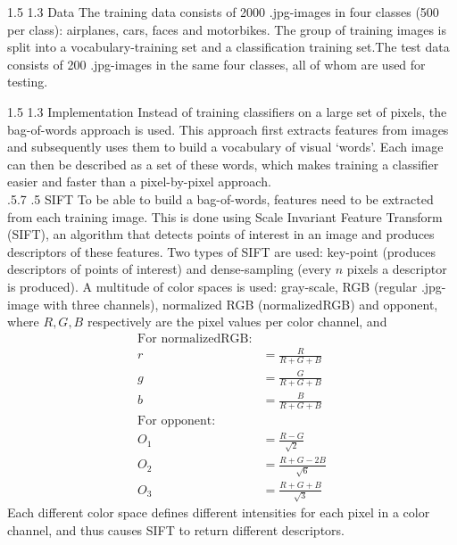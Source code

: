 \documentclass[12pt,a4paper]{amsart}
\makeatletter
\def\section{%
  \@startsection{section}{1}{\z@}%
  {1.5\linespacing\@plus\linespacing}%
  {1.3\linespacing}%
  {\bfseries\normalfont\scshape}
}
\def\subsection{\@startsection{subsection}{2}{\z@}%
  {.5\linespacing\@plus.7\linespacing}%
  {.5\linespacing}%
  {\small\normalfont}}
\makeatother
\begin{document}
\section{Data}
The training data consists of 2000 .jpg-images in four classes (500 per class): airplanes, cars, faces and motorbikes. The group of training images is split into a vocabulary-training set and a classification training set.The test data consists of 200 .jpg-images in the same four classes, all of whom are used for testing.

\section{Implementation}
Instead of training classifiers on a large set of pixels, the bag-of-words approach is used. This approach first extracts features from images and subsequently uses them to build a vocabulary of visual `words'. Each image can then be described as a set of these words, which makes training a classifier easier and faster than a pixel-by-pixel approach. \\
\subsection{SIFT}
To be able to build a bag-of-words, features need to be extracted from each training image. This is done using Scale Invariant Feature Transform (SIFT), an algorithm that detects points of interest in an image and produces descriptors of these features. Two types of SIFT are used: key-point (produces descriptors of points of interest) and dense-sampling (every $n$ pixels a descriptor is produced). A multitude of color spaces is used: gray-scale, RGB (regular .jpg-image with three channels), normalized RGB (normalizedRGB) and opponent, where $R,G,B$ respectively are the pixel values per color channel, and
\begin{align*}
\text{For normalizedRGB:}\\
r&= \frac{R}{R+G+B}\\
g&=\frac{G}{R+G+B} \\
b&= \frac{B}{R+G+B}\\
\text{For opponent:}\\
O_1&= \frac{R-G}{\sqrt{2}}\\
O_2&= \frac{R+G-2B}{\sqrt{6}}\\
O_3&= \frac{R+G+B}{\sqrt{3}}
\end{align*}
Each different color space defines different intensities for each pixel in a color channel, and thus causes SIFT to return different descriptors.
\end{document}
